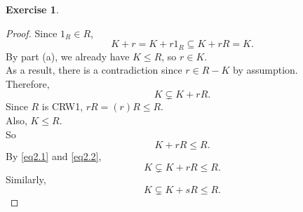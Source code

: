 \documentclass{article}
\theoremstyle{plain}
\theoremstyle{definition}
\newtheorem{exer}[lem]{Exercise}
\begin{document}
\begin{exer}
\begin{enumerate}[(a)]
\begin{enumerate}[(1)]
\begin{proof}
    Since $1_R \in R$, 
    \[K+r=K+r1_R \subseteq K+rR = K.\]
    By part (a), we already have $K \leq R$, so $r \in K$.\\
    As a result, there is a contradiction since $r \in R-K$ by assumption.\\
    Therefore, 
    \begin{equation}\label{eq2.1}
        K \subsetneq K +rR.
    \end{equation}
    Since $R$ is CRW1, $rR = (r)R \leq R$.\\
   Also, $K \leq R$.\\
   So 
   \begin{equation}\label{eq2.2}
        K+rR \leq R.
    \end{equation}
    By \eqref{eq2.1} and \eqref{eq2.2}, 
   \[K \subsetneq K +rR \leq R.\]
   Similarly, 
   \[K \subsetneq K +sR \leq R.\]


\end{proof}
\end{enumerate}
\end{enumerate}
\end{exer}
\end{document}
